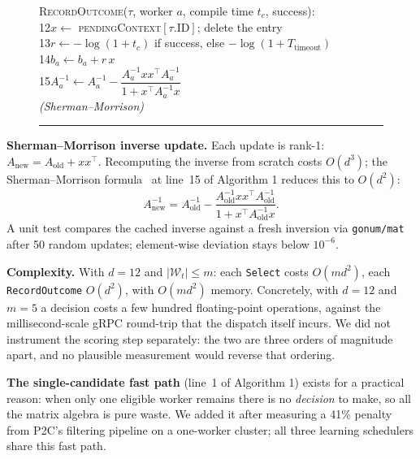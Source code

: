 \documentclass[final,5p,times,twocolumn]{elsarticle}
\begin{document}
\begin{figure}[H]
\begin{minipage}{\columnwidth}
\noindent\textsc{RecordOutcome}($\tau$, worker $a$, compile time $t_c$, success):\\
\hspace*{0.3em}12\quad $x\leftarrow$ \textsc{pendingContext}$[\tau.\text{ID}]$; delete the entry\\
\hspace*{0.3em}13\quad $r\leftarrow-\log(1+t_c)$ if success, else $-\log(1+T_{\text{timeout}})$\\
\hspace*{0.3em}14\quad $b_a\leftarrow b_a+r\,x$\\
\hspace*{0.3em}15\quad $A_a^{-1}\leftarrow A_a^{-1}-\dfrac{A_a^{-1}xx^\top A_a^{-1}}{1+x^\top A_a^{-1}x}$\\
\hspace*{2.2em}\textit{(Sherman--Morrison)}
\vspace{3pt}\hrule
\end{minipage}
\label{alg:hglinucb}
\end{figure}

\textbf{Sherman--Morrison inverse update.} Each update is rank-1: $A_{\text{new}}=A_{\text{old}}+xx^\top$. Recomputing the inverse from scratch costs $O(d^3)$; the Sherman--Morrison formula~\cite{sherman1950} at line~15 of Algorithm 1 reduces this to $O(d^2)$:
\begin{equation}
A_{\text{new}}^{-1}=A_{\text{old}}^{-1}-\frac{A_{\text{old}}^{-1}xx^\top A_{\text{old}}^{-1}}{1+x^\top A_{\text{old}}^{-1}x}.
\end{equation}
A unit test compares the cached inverse against a fresh inversion via \texttt{gonum/mat} after 50 random updates; element-wise deviation stays below $10^{-6}$.

\textbf{Complexity.} With $d=12$ and $|\mathcal{W}_t|\le m$: each \texttt{Select} costs $O(md^2)$, each \texttt{RecordOutcome} $O(d^2)$, with $O(md^2)$ memory. Concretely, with $d=12$ and $m=5$ a decision costs a few hundred floating-point operations, against the millisecond-scale gRPC round-trip that the dispatch itself incurs. We did not instrument the scoring step separately: the two are three orders of magnitude apart, and no plausible measurement would reverse that ordering.

\textbf{The single-candidate fast path} (line~1 of Algorithm 1) exists for a practical reason: when only one eligible worker remains there is no \emph{decision} to make, so all the matrix algebra is pure waste. We added it after measuring a 41\% penalty from P2C's filtering pipeline on a one-worker cluster; all three learning schedulers share this fast path.
\end{document}
